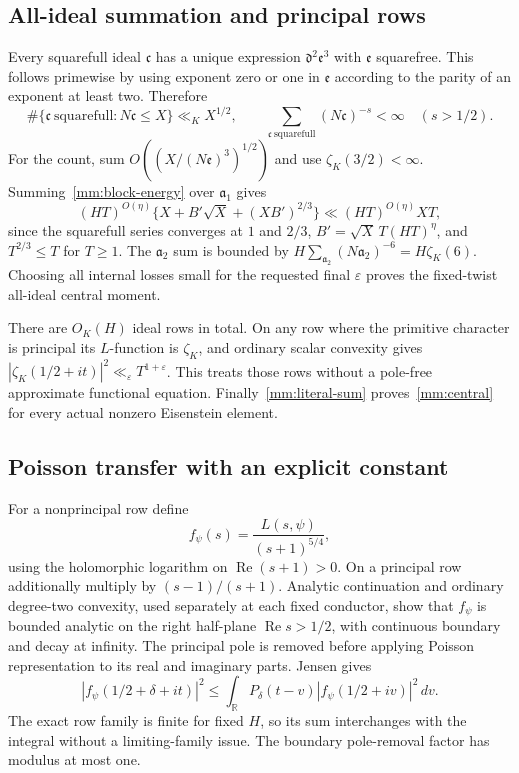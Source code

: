 \documentclass[11pt]{article}
\theoremstyle{definition}\newtheorem{definition}[theorem]{Definition}
\theoremstyle{remark}\newtheorem{remark}[theorem]{Remark}
\begin{document}
\subsection{All-ideal summation and principal rows}
Every squarefull ideal $\mathfrak c$ has a unique expression
$\mathfrak d^2\mathfrak e^3$ with $\mathfrak e$ squarefree.
This follows primewise by using exponent zero or one in $\mathfrak e$
according to the parity of an exponent at least two. Therefore
\[
 \#\{\mathfrak c\ \mathrm{squarefull}:N\mathfrak c\le X\}
 \ll_K X^{1/2},\qquad
 \sum_{\mathfrak c\ \mathrm{squarefull}}(N\mathfrak c)^{-s}<\infty
 \quad(s>1/2).
\]
For the count, sum
$O((X/(N\mathfrak e)^3)^{1/2})$ and use
$\zeta_K(3/2)<\infty$. Summing~\eqref{mm:block-energy} over
$\mathfrak a_1$ gives
\[
 (HT)^{O(\eta)}
 \{X+B'\sqrt X+(XB')^{2/3}\}
 \ll (HT)^{O(\eta)}XT,
\]
since the squarefull series converges at $1$ and $2/3$,
$B'=\sqrt X\,T(HT)^\eta$, and $T^{2/3}\le T$ for $T\ge1$.
The $\mathfrak a_2$ sum is bounded by
$H\sum_{\mathfrak a_2}(N\mathfrak a_2)^{-6}=H\zeta_K(6)$.
Choosing all internal losses small for the requested final
$\varepsilon$ proves the fixed-twist all-ideal central moment.

There are $O_K(H)$ ideal rows in total. On any row where the primitive
character is principal its $L$-function is $\zeta_K$, and ordinary
scalar convexity gives
$|\zeta_K(1/2+it)|^2\ll_\varepsilon T^{1+\varepsilon}$.
This treats those rows without a pole-free approximate functional
equation. Finally~\eqref{mm:literal-sum} proves~\eqref{mm:central}
for every actual nonzero Eisenstein element.

\subsection{Poisson transfer with an explicit constant}
For a nonprincipal row define
\[
 f_\psi(s)=\frac{L(s,\psi)}{(s+1)^{5/4}},
\]
using the holomorphic logarithm on $\operatorname{Re}(s+1)>0$.
On a principal row additionally multiply by $(s-1)/(s+1)$.
Analytic continuation and ordinary degree-two convexity, used separately
at each fixed conductor, show that $f_\psi$ is bounded analytic on the
right half-plane $\operatorname{Re}s>1/2$, with continuous boundary
and decay at infinity. The principal pole is removed before applying
Poisson representation to its real and imaginary parts. Jensen gives
\[
 |f_\psi(1/2+\delta+it)|^2
 \le\int_{\mathbb R}P_\delta(t-v)
             |f_\psi(1/2+iv)|^2\,dv.
\]
The exact row family is finite for fixed $H$, so its sum interchanges
with the integral without a limiting-family issue. The boundary
pole-removal factor has modulus at most one.
\end{document}
